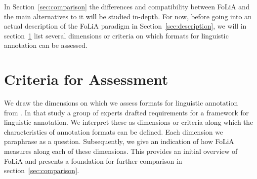 \documentclass[a4paper,10pt,twoside]{article}
\begin{document}
In Section~\ref{sec:comparison} the differences and compatibility between FoLiA
and the main alternatives to it will be studied in-depth. For now, before going
into an actual description of the FoLiA paradigm in
Section~\ref{sec:description}, we will in section~\ref{sec:criteria} list several dimensions or criteria on
which formats for linguistic annotation can be assessed.

\section{Criteria for Assessment}
\label{sec:criteria}

We draw the dimensions on which we assess formats for linguistic annotation
from . In that study a group of experts drafted requirements for
a framework for linguistic annotation. We interpret these as dimensions or
criteria along which the characteristics of annotation formats can be defined. Each dimension we paraphrase as a
question. Subsequently, we give an indication of how FoLiA measures along each of these
dimensions. This provides an initial overview of FoLiA and presents
a foundation for further comparison in section~\ref{sec:comparison}.
\end{document}
